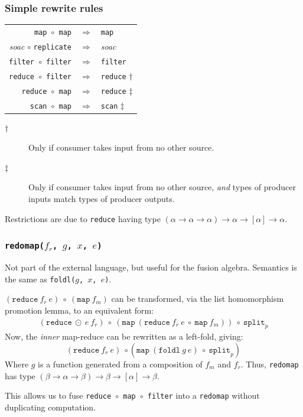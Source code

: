 \documentclass[rgb,dvipsnames]{beamer}
\begin{document}
\begin{frame}[fragile]
  \frametitle{Simple rewrite rules}

  \begin{center}
    \begin{tabular}{rcl}
      \texttt{map $\circ$ map}    & $\Rightarrow$ & \texttt{map} \\
      \textit{soac} $\circ$ \texttt{replicate} & $\Rightarrow$ & \textit{soac} \\
      \texttt{filter $\circ$ filter} & $\Rightarrow$ & \texttt{filter}  \\
      \texttt{reduce $\circ$ filter} & $\Rightarrow$ & \texttt{reduce} $\dag$  \\
      \texttt{reduce $\circ$ map} & $\Rightarrow$ & \texttt{reduce} $\ddag$ \\
      \texttt{scan $\circ$ map} & $\Rightarrow$ & \texttt{scan} $\ddag$ \\
    \end{tabular}
  \end{center}

  \begin{description}
  \item[$\dag$] Only if consumer takes input from no other
    source.
  \item[$\ddag$] Only if consumer takes input from no other source,
    \textit{and} types of producer inputs match types of producer
    outputs.
  \end{description}

  Restrictions are due to \texttt{reduce} having type
  $(\alpha\rightarrow\alpha\rightarrow\alpha)\rightarrow\alpha\rightarrow[\alpha]\rightarrow\alpha$.

\end{frame}

\begin{frame}[fragile,t]
  \frametitle{  \texttt{redomap($f_{r}$, $g$, $x$, $e$)}}

  Not part of the external language, but useful for the fusion
  algebra.  Semantics is the same as \texttt{\tt foldl($g$, $x$, $e$)}.

  $(\texttt{reduce}\ f_{r}\ e)\ \circ\ (\texttt{map}\ f_{m})$ can be
  transformed, via the list homomorphism promotion lemma, to an
  equivalent form:
  \begin{gather*}
    (\texttt{reduce}\ \odot\
    e\ f_{r})\ \circ\ (\texttt{map}\ ({\texttt{reduce}\ f_{r}\ e\ \circ\ \texttt{map}\ f_{m}}))\ \circ\ \texttt{split}_{p}
  \end{gather*}
  Now, the \textit{inner} map-reduce can be rewritten as a left-fold,
  giving:
  \[
  (\texttt{reduce}\ f_{r}\
  e)\ \circ (\texttt{map} \ ({\texttt{foldl}\ g\ e})\ \circ\ \texttt{split}_{p})
  \]
  Where $g$ is a function generated from a composition of $f_{m}$ and
  $f_{r}$.  Thus, \texttt{redomap} has type
  $(\beta\rightarrow\alpha\rightarrow\beta)\rightarrow\beta\rightarrow[\alpha]\rightarrow\beta$.

This allows us to fuse
  \texttt{reduce~$\circ$~map~$\circ$~filter} into a \texttt{redomap}
  without duplicating computation.
\end{frame}
\end{document}

